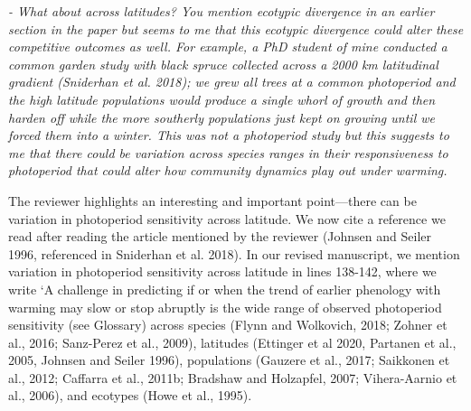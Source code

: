 \documentclass{article}
\begin{document}
 \par \emph{- What about across latitudes? You mention ecotypic divergence in an earlier section in the paper but seems to me that this ecotypic divergence could alter these competitive outcomes as well. For example, a PhD student of mine conducted a common garden study with black spruce collected across a 2000 km latitudinal gradient (Sniderhan et al. 2018); we grew all trees at a common photoperiod and the high latitude populations would produce a single whorl of growth and then harden off while the more southerly populations just kept on growing until we forced them into a winter. This was not a photoperiod study but this suggests to me that there could be variation across species ranges in their responsiveness to photoperiod that could alter how community dynamics play out under warming.}
\par The reviewer highlights an interesting and important point---there can be variation in photoperiod sensitivity across latitude. We now cite a reference we read after reading the article mentioned by the reviewer (Johnsen and Seiler 1996, referenced in Sniderhan et al. 2018). In our revised manuscript, we mention variation in photoperiod sensitivity across latitude in lines 138-142, where we write `A challenge in predicting if or when the trend of earlier phenology with warming may slow or stop abruptly is the wide range of observed photoperiod sensitivity (see Glossary) across species (Flynn and Wolkovich, 2018; Zohner et al., 2016; Sanz-Perez et al., 2009), latitudes (Ettinger et al 2020, Partanen et al., 2005, Johnsen and Seiler 1996), populations (Gauzere et al., 2017; Saikkonen et al., 2012; Caffarra et al., 2011b; Bradshaw and Holzapfel, 2007; Vihera-Aarnio et al., 2006), and ecotypes (Howe et al., 1995).
\end{document}
